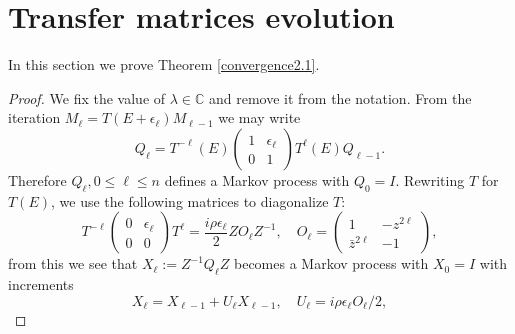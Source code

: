 \documentclass[12pt, reqno]{amsart}
\theoremstyle{definition}
\theoremstyle{remark}
\numberwithin{equation}{section}
\begin{document}
\section{Transfer matrices evolution}\label{section2}
In this section we prove Theorem \ref{convergence2.1}.
\begin{proof}
We fix the value of $\lambda\in\mathbb{C}$ and remove it from the notation. From the iteration $M_\ell=T(E+\epsilon_\ell)M_{\ell-1}$ we may write
\begin{equation}
    Q_\ell =T^{-\ell}(E)\begin{pmatrix} 1&\epsilon_\ell\\0&1\end{pmatrix} T^\ell(E)Q_{\ell-1}. 
\end{equation}
Therefore $Q_\ell,0\leq\ell\leq n$ defines a Markov process with $Q_0=I$. Rewriting $T$ for $T(E)$, we use the following matrices to diagonalize $T$:
$$
T^{-\ell}\begin{pmatrix}   0&\epsilon_\ell\\0&0\end{pmatrix}T^\ell=\frac{i\rho\epsilon_\ell}{2} Z O_\ell Z^{-1},\quad O_\ell=\begin{pmatrix}
    1&-z^{2\ell}\\ \bar{z}^{2\ell}&-1
\end{pmatrix},$$from this we see that $X_\ell:=Z^{-1}Q_\ell Z$ becomes a Markov process with $X_0=I$ with increments
\begin{equation}\label{xelldefine}
    X_\ell =X_{\ell-1}+U_\ell X_{\ell-1},\quad U_\ell=i\rho\epsilon_\ell O_\ell/2,
\end{equation}


\end{proof}
\end{document}
